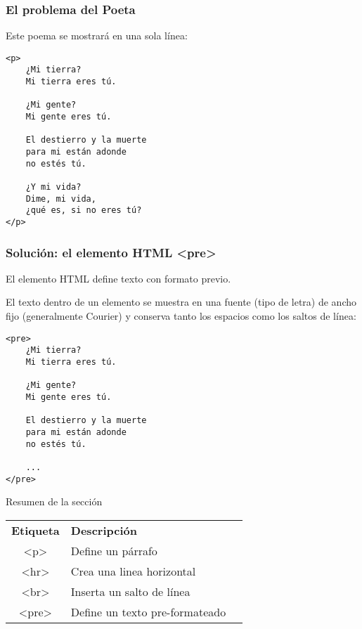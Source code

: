 \begin{frame}[fragile]
  \frametitle{El problema del Poeta}

  Este poema se mostrará en una sola línea:

  \vspace{\baselineskip}
  \begin{lstlisting}
<p>
    ¿Mi tierra?
    Mi tierra eres tú.

    ¿Mi gente?
    Mi gente eres tú.

    El destierro y la muerte
    para mi están adonde
    no estés tú.

    ¿Y mi vida?
    Dime, mi vida,
    ¿qué es, si no eres tú?
</p>
  \end{lstlisting}
\end{frame}

\begin{frame}[fragile]
  \frametitle{Solución: el elemento HTML <pre>}

  El elemento HTML  define texto con formato previo.

  \vspace{\baselineskip}
  El texto dentro de un elemento  se muestra en una fuente
  (tipo de letra) de ancho fijo (generalmente Courier) y conserva tanto
  los espacios como los saltos de línea:

  \vspace{\baselineskip}
  \begin{lstlisting}
<pre>
    ¿Mi tierra?
    Mi tierra eres tú.

    ¿Mi gente?
    Mi gente eres tú.

    El destierro y la muerte
    para mi están adonde
    no estés tú.

    ...
</pre>
  \end{lstlisting}
\end{frame}

\begin{frame}[c]{Resumen de la sección}
  \begin{table}[]
  \begin{tabular}{cll}
    \textbf{Etiqueta} &  \textbf{Descripción} \\
    \rowcolor{light-gray}
    <p>  &  Define un párrafo \\
    <hr> &  Crea una linea horizontal \\
    \rowcolor{light-gray}
    <br> &  Inserta un salto de línea \\
    <pre> &  Define un texto pre-formateado \\
  \end{tabular}
  \end{table}
\end{frame}

